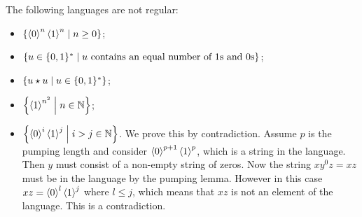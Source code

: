 \begin{example}
The following languages are not regular:
\begin{itemize}
\item $\left\{ \left\langle 0 \right\rangle^n\left\langle 1 \right\rangle^n \;\middle|\; n\geq 0 \right\}$;
\item $\left\{ u\in \{0, 1\}^* \;\middle|\; \text{$u$ contains an equal number of $1$s and $0$s} \right\}$;
\item $\left\{ u\star u \;\middle|\; u\in \{0,1\}^* \right\}$;
\item $\left\{ \left\langle 1 \right\rangle^{n^2} \;\middle|\; n\in \mathbb{N} \right\}$;
\item $\left\{ \left\langle 0 \right\rangle^i\left\langle 1 \right\rangle^j \;\middle|\; i>j \in \mathbb{N} \right\}$. We prove this by contradiction. Assume $p$ is the pumping length and consider $\left\langle 0 \right\rangle^{p+1}\left\langle 1 \right\rangle^p$, which is a string in the language. Then $y$ must consist of a non-empty string of zeros. Now the string $xy^0z = xz$ must be in the language by the pumping lemma. However in this case $xz = \left\langle 0 \right\rangle^l\left\langle 1 \right\rangle^j$ where $l\leq j$, which means that $xz$ is not an element of the language. This is a contradiction.
\end{itemize}
\end{example}